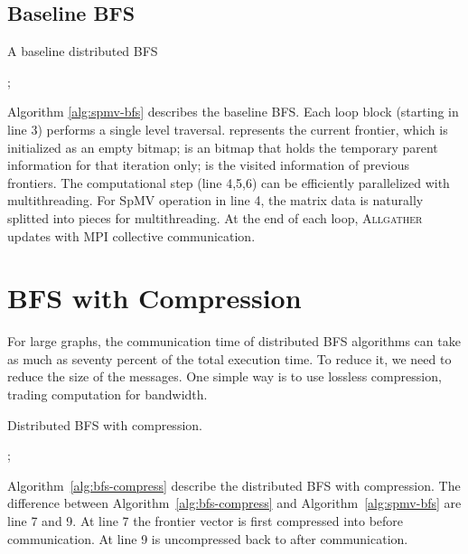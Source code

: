 \documentclass[conference]{IEEEtran}
\begin{document}
\subsection{Baseline BFS}
\label{sec:baseline-bfs-alg}

\begin{algorithm} [t] \label{alg:spmv-bfs}
\caption{A baseline distributed BFS}
\;
{
  \While{}
  {
    \;
    ; \;
    \;
    \;
  }
}
\end{algorithm}
Algorithm \ref{alg:spmv-bfs} describes the baseline BFS. Each loop block
(starting in line 3) performs a single level traversal.  represents the
current frontier, which is initialized as an empty bitmap;  is an bitmap
that holds the temporary parent information for that iteration only;  is
the visited information of previous frontiers. The computational step (line
4,5,6) can be efficiently parallelized with multithreading. For SpMV operation
in line 4, the matrix data is naturally splitted into pieces for
multithreading. At the end of each loop, \textsc{Allgather} updates  with
MPI collective communication.













\section{BFS with Compression}
\label{sec:spmv-bfs}

For large graphs, the communication time of distributed BFS algorithms can
take as much as seventy percent of the total execution time. To reduce it, we
need to reduce the size of the messages. One simple way is to use lossless
compression, trading computation for bandwidth. 




\begin{algorithm} [t] \label{alg:bfs-compress}
\caption{Distributed BFS with compression.}
\;
{
  \While{}
  {
    \;
    \;
    ; \;
    \;
    \;
    \;
  }
}
\end{algorithm}

Algorithm~\ref{alg:bfs-compress} describe the distributed BFS with
compression. The difference between Algorithm~\ref{alg:bfs-compress} and
Algorithm~\ref{alg:spmv-bfs} are line 7 and 9. At line 7 the frontier vector
 is first compressed into  before communication. At line 9  is
uncompressed back to  after communication.
\end{document}
